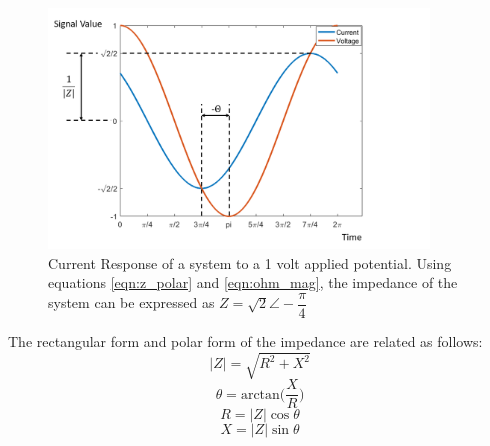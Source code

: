  \begin{figure}[ht]
    \centering
    \includegraphics[width=0.9\textwidth]{images/ac_signal.png}
    \caption[Current Response of a system to an applied voltage]{Current Response of a system to a 1 volt applied potential. Using equations \ref{eqn:z_polar} and \ref{eqn:ohm_mag}, the impedance of the system can be expressed as $Z=\sqrt{2}\angle -\dfrac{\pi}{4}$} 
    \label{fig:ac_signal}
 \end{figure}
 
 \par The rectangular form and polar form of the impedance are related as follows:
 \begin{equation}
     |Z| = \sqrt{R^2 + X^2}
 \end{equation}
 \begin{equation}
    \theta = \text{arctan}\Big(\frac{X}{R}\Big)
 \end{equation}
 \begin{equation}
    R = |Z|\cos\theta
 \end{equation}
 \begin{equation}
     X = |Z|\sin\theta
 \end{equation}
 
